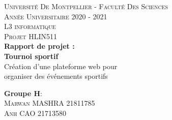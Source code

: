 \documentclass[a4paper,12pt]{report}   %
\begin{document}
\makeatletter
  \begin{titlepage}
  \centering
      {\Large \textsc{Université De Montpellier - Faculté Des Sciences}}\\
      \large\textsc{Année Universitaire 2020 - 2021}\\
      \Large\textsc{L3 informatique}\\
      \textsc{Projet HLIN511}\\
    \vspace{3.5 cm}
      \Huge{\textbf{Rapport de projet : }}\\
      \vspace{0.5cm}
    \vspace{0.3cm}
      {\textbf{Tournoi sportif}}\\
      \vspace{0.3cm}
      \Large
      Création d'une plateforme web pour \\
      organiser des événements sportifs\\
    \vspace{4.5cm}
    \raggedright

    \textbf{Groupe H}:\\
    \vspace{0.2 cm}
    \textsc{{Marwan MASHRA 21811785}}\\
    \textsc{{Anh CAO 21713580}}\\
    


\end{titlepage}
\end{document}
